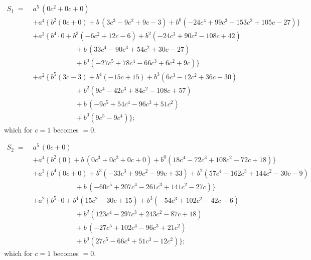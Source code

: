 \documentclass[11pt]{article}
\begin{document}
\medskip

\begin{align*}
S_{1} \;=\;& a^{5}\,(0c^{2}+0c+0) \\
&+ a^{4}\,\bigl\{\,b^{2}(0c+0) + b\,(3c^{3}-9c^{2}+9c-3) + b^{0}(-24c^{4}+99c^{3}-153c^{2}+105c-27)\bigr\} \\
&+ a^{3}\,\bigl\{\,b^{4}\!\cdot 0 + b^{3}(-6c^{2}+12c-6) + b^{2}(-24c^{3}+90c^{2}-108c+42) \\
&\hspace{6em} + b\,(33c^{4}-90c^{3}+54c^{2}+30c-27) \\
&\hspace{6em} + b^{0}(-27c^{5}+78c^{4}-66c^{3}+6c^{2}+9c)\bigr\} \\
&+ a^{2}\,\bigl\{\,b^{5}(3c-3) + b^{4}(-15c+15) + b^{3}(6c^{3}-12c^{2}+36c-30) \\
&\hspace{6em} + b^{2}(9c^{4}-42c^{3}+84c^{2}-108c+57) \\
&\hspace{6em} + b\,(-9c^{5}+54c^{4}-96c^{3}+51c^{2}) \\
&\hspace{6em} + b^{0}(9c^{5}-9c^{4})\bigr\};
\end{align*}
which for $c = 1$ becomes $= 0$.

\medskip

\begin{align*}
S_{2} \;=\;& a^{5}\,(0c+0) \\
&+ a^{4}\,\bigl\{\,b^{2}(0) + b\,(0c^{3}+0c^{2}+0c+0) + b^{0}(18c^{4}-72c^{3}+108c^{2}-72c+18)\bigr\} \\
&+ a^{3}\,\bigl\{\,b^{4}(0c+0) + b^{3}(-33c^{3}+99c^{2}-99c+33) + b^{2}(57c^{4}-162c^{3}+144c^{2}-30c-9) \\
&\hspace{6em} + b\,(-60c^{5}+207c^{4}-261c^{3}+141c^{2}-27c)\bigr\} \\
&+ a^{2}\,\bigl\{\,b^{5}\!\cdot 0 + b^{4}(15c^{2}-30c+15) + b^{3}(-54c^{3}+102c^{2}-42c-6) \\
&\hspace{6em} + b^{2}(123c^{4}-297c^{3}+243c^{2}-87c+18) \\
&\hspace{6em} + b\,(-27c^{5}+102c^{4}-96c^{3}+21c^{2}) \\
&\hspace{6em} + b^{0}(27c^{5}-66c^{4}+51c^{3}-12c^{2})\bigr\};
\end{align*}
which for $c = 1$ becomes $= 0$.
\end{document}
